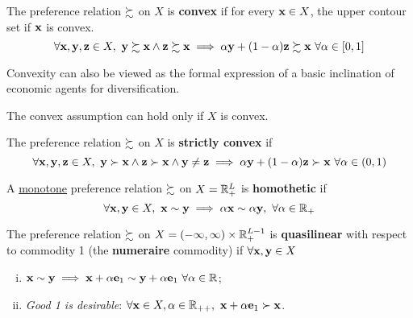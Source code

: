 \documentclass{article}
\begin{document}
 			\begin{definition}[3.B.4]
 				The preference relation $\succsim$ on $X$ is \textbf{convex} if for every $\textbf{x} \in X$, the upper contour set if $\textbf{x}$ is convex.
 				\begin{equation}
 					\forall \vex, \vey, \vez \in X,\ \vey \pref \vex \land \vez \pref \vex \implies \alpha \vey + (1-\alpha) \vez \pref \vex\ \forall \alpha \in [0, 1]
 				\end{equation}
 			\end{definition}
 			
 			\begin{remark}
 				Convexity can also be viewed as the formal expression of a basic inclination of economic agents for diversification.
 			\end{remark}
 			
 			\begin{remark}
 				The convex assumption can hold only if $X$ is convex.
 			\end{remark}
 			
 			\begin{definition}[3.B.5]
 				The preference relation $\succsim$ on $X$ is \textbf{strictly convex} if
 				\begin{equation}
 					\forall \textbf{x}, \textbf{y}, \textbf{z} \in X,\ \textbf{y} \succ \textbf{x} \land \textbf{z} \succ \textbf{x} \land \textbf{y} \neq \textbf{z} \implies \alpha \textbf{y} + (1-\alpha) \textbf{z} \succ \textbf{x}\ \forall \alpha \in (0, 1)
 				\end{equation}
 			\end{definition}
 			
 			\begin{definition}[3.B.6]
 				A \ul{monotone} preference relation $\succsim$ on $X = \mathbb{R}^L_+$ is \textbf{homothetic} if 
 				\begin{equation}
 					\forall \textbf{x}, \textbf{y} \in X,\ \textbf{x} \sim \textbf{y} \implies \alpha \textbf{x} \sim \alpha \textbf{y},\ \forall \alpha \in \mathbb{R}_+
 				\end{equation}
 			\end{definition}
 			
 			\begin{definition}[3.B.7]
 				The preference relation $\succsim$ on $X = (-\infty, \infty) \times \mathbb{R}^{L-1}_+$ is \textbf{quasilinear} with respect to commodity 1 (the \textbf{numeraire} commodity) if $\forall \textbf{x}, \textbf{y} \in X$
 				\begin{enumerate}[(i)]
 					\item $\textbf{x} \sim \textbf{y} \implies \textbf{x} + \alpha \textbf{e}_1 \sim \textbf{y} + \alpha \textbf{e}_1\ \forall \alpha \in \mathbb{R}$;
 					\item \emph{Good 1 is desirable}: $\forall \textbf{x} \in X, \alpha \in \mathbb{R}_{++},\ \textbf{x} + \alpha \textbf{e}_1 \succ \textbf{x}$.
 				\end{enumerate}
 			\end{definition}
\end{document}
